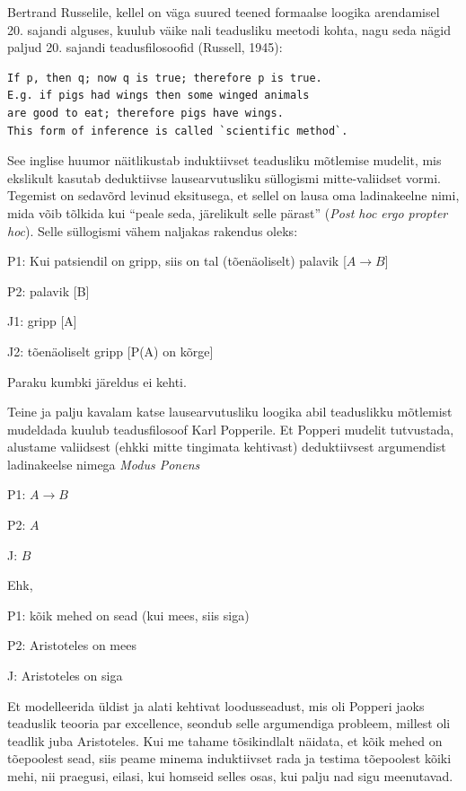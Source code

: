 \documentclass[]{book}
\begin{document}
Bertrand Russelile, kellel on väga suured teened formaalse loogika arendamisel 20. sajandi alguses, kuulub väike nali teadusliku meetodi kohta, nagu seda nägid paljud 20. sajandi teadusfilosoofid (Russell, 1945):

\begin{verbatim}
If p, then q; now q is true; therefore p is true. 
E.g. if pigs had wings then some winged animals 
are good to eat; therefore pigs have wings. 
This form of inference is called `scientific method`.
\end{verbatim}

See inglise huumor näitlikustab induktiivset teadusliku mõtlemise mudelit, mis ekslikult kasutab deduktiivse lausearvutusliku süllogismi mitte-valiidset vormi. Tegemist on sedavõrd levinud eksitusega, et sellel on lausa oma ladinakeelne nimi, mida võib tõlkida kui ``peale seda, järelikult selle pärast'' (\emph{Post hoc ergo propter hoc}). Selle süllogismi vähem naljakas rakendus oleks:

P1: Kui patsiendil on gripp, siis on tal (tõenäoliselt) palavik {[}\(A \rightarrow B\){]}

P2: palavik {[}B{]}

J1: gripp {[}A{]}

J2: tõenäoliselt gripp {[}P(A) on kõrge{]}

Paraku kumbki järeldus ei kehti.

Teine ja palju kavalam katse lausearvutusliku loogika abil teaduslikku mõtlemist mudeldada kuulub teadusfilosoof Karl Popperile. Et Popperi mudelit tutvustada, alustame valiidsest (ehkki mitte tingimata kehtivast) deduktiivsest argumendist ladinakeelse nimega \emph{Modus Ponens}

P1: \(A \rightarrow B\)

P2: \(A\)

J: \(B\)

Ehk,

P1: kõik mehed on sead (kui mees, siis siga)

P2: Aristoteles on mees

J: Aristoteles on siga

Et modelleerida üldist ja alati kehtivat loodusseadust, mis oli Popperi jaoks teaduslik teooria par excellence, seondub selle argumendiga probleem, millest oli teadlik juba Aristoteles. Kui me tahame tõsikindlalt näidata, et kõik mehed on tõepoolest sead, siis peame minema induktiivset rada ja testima tõepoolest kõiki mehi, nii praegusi, eilasi, kui homseid selles osas, kui palju nad sigu meenutavad.
\end{document}
